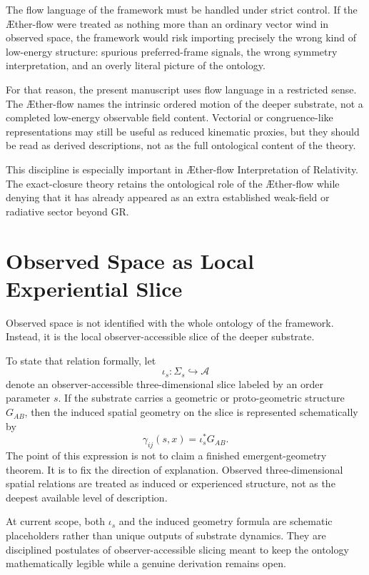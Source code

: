 \documentclass[11pt]{article}
\newcommand{\Aflow}{\AE{}ther-flow}
\newcommand{\TheoryName}{\Aflow{} Interpretation of Relativity}
\newcommand{\Sub}{\mathcal{A}}
\begin{document}
The flow language of the framework must be handled under strict control. If the \Aflow{} were treated as nothing more than an ordinary vector wind in observed space, the framework would risk importing precisely the wrong kind of low-energy structure: spurious preferred-frame signals, the wrong symmetry interpretation, and an overly literal picture of the ontology.

For that reason, the present manuscript uses flow language in a restricted sense. The \Aflow{} names the intrinsic ordered motion of the deeper substrate, not a completed low-energy observable field content. Vectorial or congruence-like representations may still be useful as reduced kinematic proxies, but they should be read as derived descriptions, not as the full ontological content of the theory.

This discipline is especially important in \TheoryName{}. The exact-closure theory retains the ontological role of the \Aflow{} while denying that it has already appeared as an extra established weak-field or radiative sector beyond GR.

\section{Observed Space as Local Experiential Slice}

Observed space is not identified with the whole ontology of the framework. Instead, it is the local observer-accessible slice of the deeper substrate.

To state that relation formally, let
\[
\iota_s:\Sigma_s \hookrightarrow \Sub
\]
denote an observer-accessible three-dimensional slice labeled by an order parameter \(s\). If the substrate carries a geometric or proto-geometric structure \(G_{AB}\), then the induced spatial geometry on the slice is represented schematically by
\[
\gamma_{ij}(s,x) = \iota_s^{*} G_{AB}.
\]
The point of this expression is not to claim a finished emergent-geometry theorem. It is to fix the direction of explanation. Observed three-dimensional spatial relations are treated as induced or experienced structure, not as the deepest available level of description.

At current scope, both \(\iota_s\) and the induced geometry formula are schematic placeholders rather than unique outputs of substrate dynamics. They are disciplined postulates of observer-accessible slicing meant to keep the ontology mathematically legible while a genuine derivation remains open.
\end{document}
